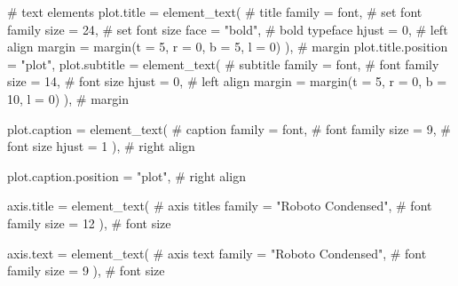 \documentclass[
  letterpaper,
  DIV=11,
  numbers=noendperiod]{scrartcl}
\newenvironment{Shaded}{\begin{snugshade}}{\end{snugshade}}
\newcommand{\AttributeTok}[1]{\textcolor[rgb]{0.40,0.45,0.13}{#1}}
\newcommand{\CommentTok}[1]{\textcolor[rgb]{0.37,0.37,0.37}{#1}}
\newcommand{\DecValTok}[1]{\textcolor[rgb]{0.68,0.00,0.00}{#1}}
\newcommand{\FunctionTok}[1]{\textcolor[rgb]{0.28,0.35,0.67}{#1}}
\newcommand{\NormalTok}[1]{\textcolor[rgb]{0.00,0.23,0.31}{#1}}
\newcommand{\StringTok}[1]{\textcolor[rgb]{0.13,0.47,0.30}{#1}}
\begin{document}
\begin{Shaded}
\begin{Highlighting}[]
      \CommentTok{\# text elements}
      \AttributeTok{plot.title =} \FunctionTok{element\_text}\NormalTok{( }\CommentTok{\# title}
        \AttributeTok{family =}\NormalTok{ font, }\CommentTok{\# set font family}
        \AttributeTok{size =} \DecValTok{24}\NormalTok{, }\CommentTok{\# set font size}
        \AttributeTok{face =} \StringTok{"bold"}\NormalTok{, }\CommentTok{\# bold typeface}
        \AttributeTok{hjust =} \DecValTok{0}\NormalTok{, }\CommentTok{\# left align}
        \AttributeTok{margin =} \FunctionTok{margin}\NormalTok{(}\AttributeTok{t =} \DecValTok{5}\NormalTok{, }\AttributeTok{r =} \DecValTok{0}\NormalTok{, }\AttributeTok{b =} \DecValTok{5}\NormalTok{, }\AttributeTok{l =} \DecValTok{0}\NormalTok{)}
\NormalTok{      ), }\CommentTok{\# margin}
      \AttributeTok{plot.title.position =} \StringTok{"plot"}\NormalTok{,}
      \AttributeTok{plot.subtitle =} \FunctionTok{element\_text}\NormalTok{( }\CommentTok{\# subtitle}
        \AttributeTok{family =}\NormalTok{ font, }\CommentTok{\# font family}
        \AttributeTok{size =} \DecValTok{14}\NormalTok{, }\CommentTok{\# font size}
        \AttributeTok{hjust =} \DecValTok{0}\NormalTok{, }\CommentTok{\# left align}
        \AttributeTok{margin =} \FunctionTok{margin}\NormalTok{(}\AttributeTok{t =} \DecValTok{5}\NormalTok{, }\AttributeTok{r =} \DecValTok{0}\NormalTok{, }\AttributeTok{b =} \DecValTok{10}\NormalTok{, }\AttributeTok{l =} \DecValTok{0}\NormalTok{)}
\NormalTok{      ), }\CommentTok{\# margin}

      \AttributeTok{plot.caption =} \FunctionTok{element\_text}\NormalTok{( }\CommentTok{\# caption}
        \AttributeTok{family =}\NormalTok{ font, }\CommentTok{\# font family}
        \AttributeTok{size =} \DecValTok{9}\NormalTok{, }\CommentTok{\# font size}
        \AttributeTok{hjust =} \DecValTok{1}
\NormalTok{      ), }\CommentTok{\# right align}

      \AttributeTok{plot.caption.position =} \StringTok{"plot"}\NormalTok{, }\CommentTok{\# right align}

      \AttributeTok{axis.title =} \FunctionTok{element\_text}\NormalTok{( }\CommentTok{\# axis titles}
        \AttributeTok{family =} \StringTok{"Roboto Condensed"}\NormalTok{, }\CommentTok{\# font family}
        \AttributeTok{size =} \DecValTok{12}
\NormalTok{      ), }\CommentTok{\# font size}

      \AttributeTok{axis.text =} \FunctionTok{element\_text}\NormalTok{( }\CommentTok{\# axis text}
        \AttributeTok{family =} \StringTok{"Roboto Condensed"}\NormalTok{, }\CommentTok{\# font family}
        \AttributeTok{size =} \DecValTok{9}
\NormalTok{      ), }\CommentTok{\# font size}


\end{Highlighting}
\end{Shaded}
\end{document}
